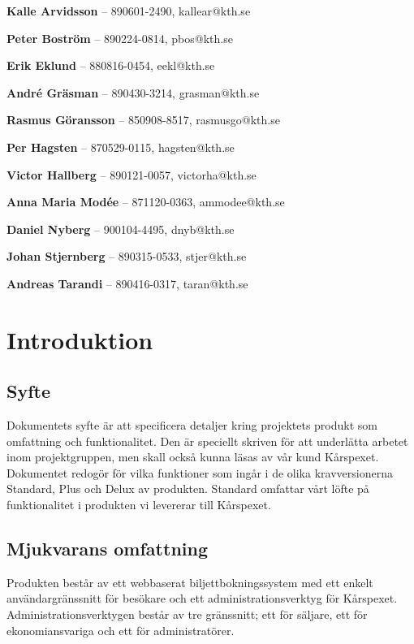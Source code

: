\documentclass[a4paper, twoside, 11pt, titlepage]{article}
\begin{document}
\textbf{Kalle Arvidsson} -- 890601-2490, kallear@kth.se

\textbf{Peter Boström} -- 890224-0814, pbos@kth.se

\textbf{Erik Eklund} -- 880816-0454, eekl@kth.se 

\textbf{André Gräsman} -- 890430-3214, grasman@kth.se 

\textbf{Rasmus Göransson} -- 850908-8517, rasmusgo@kth.se 

\textbf{Per Hagsten} -- 870529-0115, hagsten@kth.se

\textbf{Victor Hallberg} -- 890121-0057, victorha@kth.se

\textbf{Anna Maria Modée} -- 871120-0363, ammodee@kth.se 

\textbf{Daniel Nyberg} -- 900104-4495, dnyb@kth.se 

\textbf{Johan Stjernberg} -- 890315-0533, stjer@kth.se

\textbf{Andreas Tarandi} -- 890416-0317, taran@kth.se

\clearpage \tableofcontents \clearpage

\clearpage
\section{Introduktion}



	\subsection{Syfte}


	Dokumentets syfte är att specificera detaljer kring projektets produkt som omfattning och funktionalitet. Den är speciellt skriven för att underlätta arbetet inom projektgruppen, men skall också kunna läsas av vår kund Kårspexet. Dokumentet redogör för vilka funktioner som ingår i de olika kravversionerna Standard, Plus och Delux av produkten. Standard omfattar vårt löfte på funktionalitet i produkten vi levererar till Kårspexet.

	\subsection{Mjukvarans omfattning}


	Produkten består av ett webbaserat biljettbokningssystem med ett enkelt användargränssnitt för besökare och ett administrationsverktyg för Kårspexet. Administrationsverktygen består av tre gränssnitt; ett för säljare, ett för ekonomiansvariga och ett för administratörer.
\end{document}
